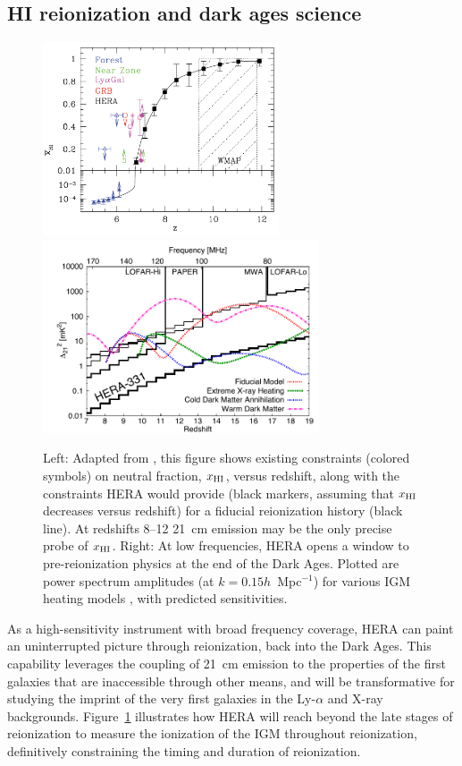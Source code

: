 \documentclass[preprint]{aastex}
\def\HI{{H{\small I }}}
\def\xHI{{x_{\rm\HI}}}
\begin{document}


\subsection{HI reionization and dark ages science} %

\begin{figure}[t]\centering
\includegraphics[height=2.25in]{plots/constraints.pdf}
\includegraphics[height=2.25in]{plots/Xray/HERA_II_compare_kp1_whoriz_20pt.pdf} 
\caption{\small 
Left: 
Adapted from \citet{robertson_2013}, this figure shows existing
constraints (colored symbols) on neutral fraction, $\xHI$, versus redshift, along with 
the constraints HERA would provide (black markers, assuming
that $\xHI$ decreases versus redshift) for a fiducial
reionization history (black line).
At redshifts 8--12
21~cm emission may be the only precise probe of $\xHI$.
Right: At low frequencies, HERA opens a window to
pre-reionization physics at the end of the Dark Ages. Plotted are power spectrum amplitudes (at $k =
0.15h$~Mpc$^{-1}$) for various IGM heating models \citep{mesinger_et_al2013},
with predicted sensitivities.
}\label{fig:x_i_vs_z} \end{figure}

As a high-sensitivity instrument with broad frequency coverage, HERA can
paint an uninterrupted picture through reionization, back into
the Dark Ages.
This capability leverages the coupling of
21~cm emission to the properties of the first galaxies that
are inaccessible through other means, 
 and will be transformative for
studying the imprint of the
very first galaxies in the Ly-$\alpha$ and X-ray backgrounds.  
Figure~\ref{fig:x_i_vs_z} illustrates how HERA will
reach beyond the late stages of reionization to measure the
ionization of the IGM throughout reionization, definitively constraining the timing
and duration of reionization.
\end{document}
